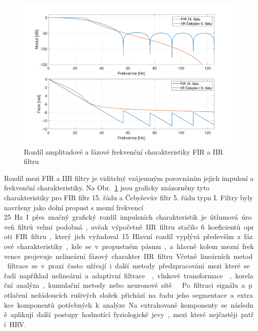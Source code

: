 \begin{figure}[h]
	\begin{center}
		\includegraphics[width=1\textwidth]{../assets/figures/filters_comparison}
		\caption{Rozdíl amplitudové a fázové frekvenční charakteristiky FIR a IIR filtru}
		\label{fig:filters_comparison}
	\end{center}
\end{figure}

Rozdíl mezi FIR a IIR filtry je viditelný vzájemným porovnáním jejich impulsní a
frekvenční charakteristiky. Na Obr.~\ref{fig:filters_comparison} jsou graficky
znázorněny tyto charakteristiky pro FIR filtr 15. řádu a Čebyševův filtr 5. řádu
typu I. Filtry byly navrženy jako dolní propust s mezní frekvencí 25~\si\Hz. I
přes značný grafický rozdíl impulsních charakteristik je útlumová úroveň filtrů
velmi podobná, avšak výpočetně IIR filtru stačilo 6 koeficientů oproti FIR
filtru, který jich vyžadoval 15. Hlavní rozdíl vyplývá především z fázové
charakteristiky, kde se v propustném pásmu, a hlavně kolem mezní frekvence
projevuje nelineární fázový charakter IIR filtru.

Včetně lineárních metod filtrace se v praxi často užívají i další metody
předzpracování mezi které se řadí například nelineární a adaptivní
filtrace~\cite{Sornmo1982,Pan1985}, vlnkové
transformace~\cite{Yao2020,Ndiaye2020}, korelační analýza, kumulační metody nebo
neuronové sítě~\cite{Kiranyaz2016,Zhai2018}~\cite{Jan2002}. Po filtraci signálu
a potlačení nežádoucích rušivých složek přichází na řadu jeho segmentace a
extrakce komponentů potřebných k analýze. Na extrahované komponenty se následně
aplikují další postupy hodnotící fyziologické jevy, mezi které nejčastěji patří
HRV.

